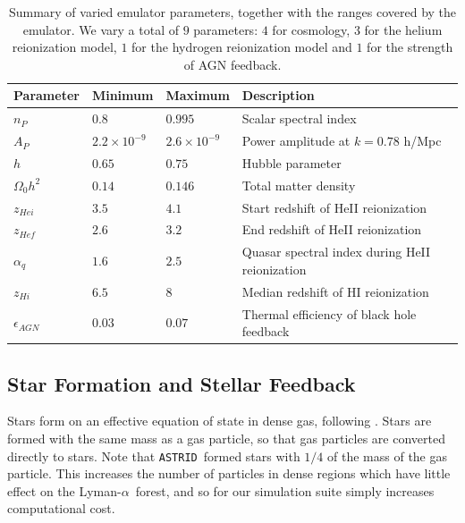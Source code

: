 \documentclass[a4paper,11pt]{article}
\newcommand{\Lya}{Lyman-$\alpha$}
\newcommand{\astrid}{\texttt{ASTRID}}
\begin{document}

\begin{table}
\begin{centering}
  \begin{tabular}{llll}
  \hline
  Parameter & Minimum & Maximum & Description \\
    \hline
    $n_P$  &  $0.8$  & $0.995$ & Scalar spectral index \\
    $A_P$  &  $2.2 \times 10^{-9}$  & $2.6 \times 10^{-9}$ & Power amplitude at $k = 0.78$ h/Mpc \\
    $h$    & $0.65$  & $0.75$ & Hubble parameter \\
    $\Omega_0 h^2$ & $0.14$ & $0.146$ & Total matter density \\
    $z_{Hei}$      & $3.5$  & $4.1$  & Start redshift of HeII reionization \\
    $z_{Hef}$      & $2.6$  & $3.2$  & End redshift of HeII reionization \\
    $\alpha_q$     & $1.6$  & $2.5$ & Quasar spectral index during HeII reionization  \\
    $z_{Hi}$        & $6.5$ & $8$   & Median redshift of HI reionization \\
    $\epsilon_{AGN}$ & $0.03$ & $0.07$ & Thermal efficiency of black hole feedback \\
    \hline
  \end{tabular}
  \caption{Summary of varied emulator parameters, together with the ranges covered by the emulator. We vary a total of $9$ parameters: $4$ for cosmology, $3$ for the helium reionization model, $1$ for the hydrogen reionization model and $1$ for the strength of AGN feedback.}
  \label{tab:emulatorparams}
  \end{centering}
\end{table}

\subsection{Star Formation and Stellar Feedback}
\label{sec:stellar}

Stars form on an effective equation of state in dense gas, following \cite{Springel:2003}. Stars are formed with the same mass as a gas particle, so that gas particles are converted directly to stars. Note that \astrid~formed stars with $1/4$ of the mass of the gas particle. This increases the number of particles in dense regions which have little effect on the \Lya~forest, and so for our simulation suite simply increases computational cost.
\end{document}
